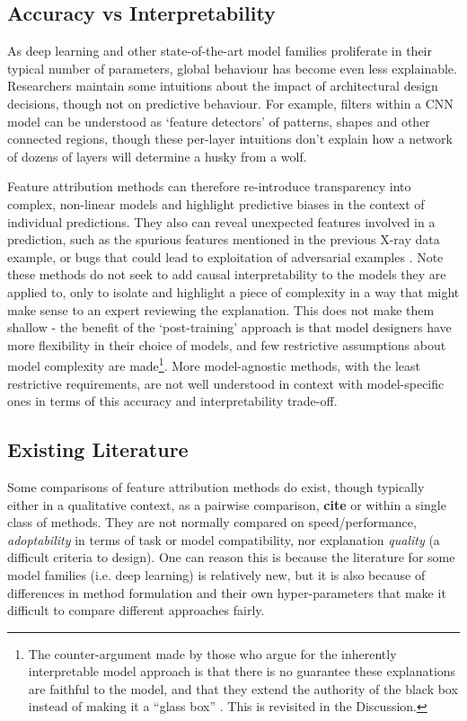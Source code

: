\documentclass[main]{subfiles}
\begin{document}
\subsection*{Accuracy vs Interpretability}

As deep learning and other state-of-the-art model families proliferate in their typical number of parameters, global behaviour has become even less explainable. Researchers maintain some intuitions about the impact of architectural design decisions, though not on predictive behaviour. For example, filters within a CNN model can be understood as `feature detectors' of patterns, shapes and other connected regions, though these per-layer intuitions don't explain how a network of dozens of layers will determine a husky from a wolf.

Feature attribution methods can therefore re-introduce transparency into complex, non-linear models and highlight predictive biases in the context of individual predictions. They also can reveal unexpected features involved in a prediction, such as the spurious features mentioned in the previous X-ray data example, or bugs that could lead to exploitation of adversarial examples \cite{adversary}. Note these methods do not seek to add causal interpretability to the models they are applied to, only to isolate and highlight a piece of complexity in a way that might make sense to an expert reviewing the explanation. This does not make them shallow - the benefit of the `post-training' approach is that model designers have more flexibility in their choice of models, and few restrictive assumptions about model complexity are made\footnote{The counter-argument made by those who argue for the inherently interpretable model approach is that there is no guarantee these explanations are faithful to the model, and that they extend the authority of the black box instead of making it a ``glass box'' \cite{rudin}. This is revisited in the Discussion.}. More model-agnostic methods, with the least restrictive requirements, are not well understood in context with model-specific ones in terms of this accuracy and interpretability trade-off.

\subsection*{Existing Literature}

Some comparisons of feature attribution methods do exist, though typically either in a qualitative context, as a pairwise comparison, \textbf{cite} or within a single class of methods. They are not normally compared on speed/performance, \textit{adoptability} in terms of task or model compatibility, nor explanation \textit{quality} (a difficult criteria to design). One can reason this is because the literature for some model families (i.e. deep learning) is relatively new, but it is also because of differences in method formulation and their own hyper-parameters that make it difficult to compare different approaches fairly.
\end{document}

